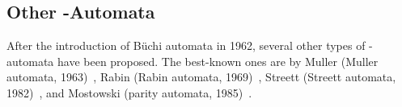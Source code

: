 





\subsection{Other \om-Automata}
After the introduction of Büchi automata in 1962, several other types of \om-automata have been proposed. The best-known ones are by Muller (Muller automata, 1963)~\cite{1963_muller}, Rabin (Rabin automata, 1969)~\cite{rabin1969decidability}, Streett (Streett automata, 1982)~\cite{Streett1982121}, and Mostowski (parity automata, 1985)~\cite{1985_mostowski}.


